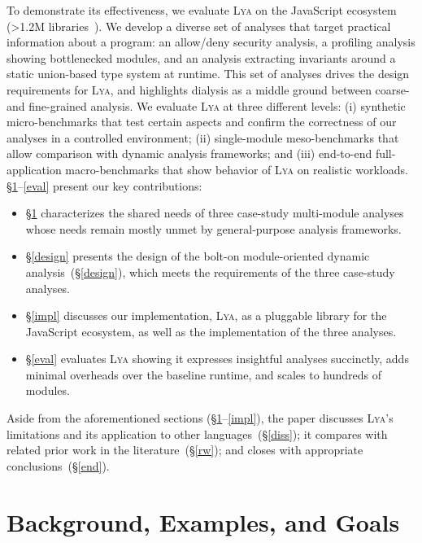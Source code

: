 \documentclass[letterpaper,twocolumn,10pt]{article}
\newcommand{\sx}[1]{(\S\ref{#1})}
\newcommand{\sys}{{\scshape Lya}\xspace}
\begin{document}
To demonstrate its effectiveness, we evaluate \sys on the JavaScript ecosystem (>1.2M libraries~\cite{modulecounts}). %
We develop a diverse set of analyses that target practical information about a program:
  an allow/deny security analysis,
  a profiling analysis showing bottlenecked modules,
  and an analysis extracting invariants around a static union-based type system at runtime.
This set of analyses drives the design requirements for \sys, and highlights dialysis as a middle ground between coarse- and fine-grained analysis.
We evaluate \sys at three different levels:
  (i) synthetic micro-benchmarks that test certain aspects and confirm the correctness of our analyses in a controlled environment;
  (ii) single-module meso-benchmarks that allow comparison with dynamic analysis frameworks; and
  (iii) end-to-end full-application macro-benchmarks that show behavior of \sys on realistic workloads. 
\S\ref{bg}--\ref{eval} present our key contributions:
\begin{itemize}
\item \S\ref{bg} characterizes the shared needs of three case-study multi-module analyses whose needs remain mostly unmet by general-purpose analysis frameworks.
\item \S\ref{design} presents the design of the bolt-on module-oriented dynamic analysis~\sx{design}, which meets the requirements of the three case-study analyses.
\item \S\ref{impl} discusses our implementation, \sys, as a pluggable library for the JavaScript ecosystem, as well as the implementation of the three analyses.
\item \S\ref{eval} evaluates \sys showing it expresses insightful analyses succinctly, adds minimal overheads over the baseline runtime, and scales to hundreds of modules.
\end{itemize}

Aside from the aforementioned sections (\S\ref{bg}--\ref{impl}), the paper discusses \sys's limitations and its application to other languages~\sx{diss};
  it compares with related prior work in the literature~\sx{rw};
  and closes with appropriate conclusions~\sx{end}.


\section{Background, Examples, and Goals}
\label{bg}
\end{document}

